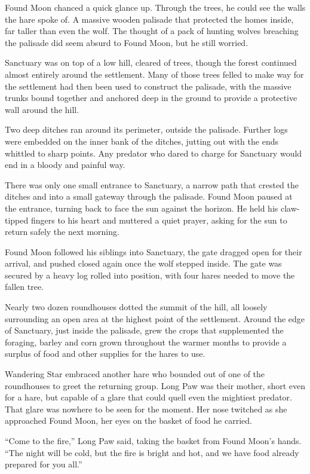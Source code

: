 Found Moon chanced a quick glance up. Through the trees, he could see the walls the hare spoke of. A massive wooden palisade that protected the homes inside, far taller than even the wolf. The thought of a pack of hunting wolves breaching the palisade did seem absurd to Found Moon, but he still worried.

Sanctuary was on top of a low hill, cleared of trees, though the forest continued almost entirely around the settlement. Many of those trees felled to make way for the settlement had then been used to construct the palisade, with the massive trunks bound together and anchored deep in the ground to provide a protective wall around the hill.

Two deep ditches ran around its perimeter, outside the palisade. Further logs were embedded on the inner bank of the ditches, jutting out with the ends whittled to sharp points. Any predator who dared to charge for Sanctuary would end in a bloody and painful way.

There was only one small entrance to Sanctuary, a narrow path that crested the ditches and into a small gateway through the palisade. Found Moon paused at the entrance, turning back to face the sun against the horizon. He held his claw-tipped fingers to his heart and muttered a quiet prayer, asking for the sun to return safely the next morning.

Found Moon followed his siblings into Sanctuary, the gate dragged open for their arrival, and pushed closed again once the wolf stepped inside. The gate was secured by a heavy log rolled into position, with four hares needed to move the fallen tree.

Nearly two dozen roundhouses dotted the summit of the hill, all loosely surrounding an open area at the highest point of the settlement. Around the edge of Sanctuary, just inside the palisade, grew the crops that supplemented the foraging, barley and corn grown throughout the warmer months to provide a surplus of food and other supplies for the hares to use.

Wandering Star embraced another hare who bounded out of one of the roundhouses to greet the returning group. Long Paw was their mother, short even for a hare, but capable of a glare that could quell even the mightiest predator. That glare was nowhere to be seen for the moment. Her nose twitched as she approached Found Moon, her eyes on the basket of food he carried.

``Come to the fire,'' Long Paw said, taking the basket from Found Moon's hands. ``The night will be cold, but the fire is bright and hot, and we have food already prepared for you all.''

